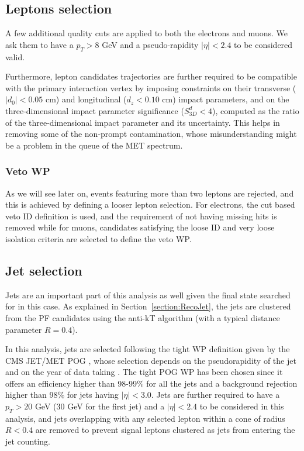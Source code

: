 \documentclass[a4paper, 10pt, openright]{report}
\begin{document}
\subsection{Leptons selection} \label{section:LepSel}

A few additional quality cuts are applied to both the electrons and muons. We ask them to have a $p_T > 8$ GeV and a pseudo-rapidity $|\eta| < 2.4$ to be considered valid.

Furthermore, lepton candidates trajectories are further required to be compatible with the primary interaction vertex by imposing constraints on their transverse ($|d_0| < 0.05$ cm) and longitudinal ($d_z < 0.10$ cm) impact parameters, and on the three-dimensional impact parameter significance ($S^d_{3D} < 4$), computed as the ratio of the three-dimensional impact parameter and its uncertainty. This helps in removing some of the non-prompt contamination, whose misunderstanding might be a problem in the queue of the \ac{MET} spectrum.

\subsubsection{Veto \ac{WP}}

As we will see later on, events featuring more than two leptons are rejected, and this is achieved by defining a looser lepton selection. For electrons, the cut based veto ID definition is used, and the requirement of not having missing hits is removed while for muons, candidates satisfying the loose ID and very loose isolation criteria are selected to define the veto \ac{WP}.

\subsection{Jet selection} \label{section:JetSel}

Jets are an important part of this analysis as well given the final state searched for in this case. As explained in Section~\ref{section:RecoJet}, the jets are clustered from the \ac{PF} candidates using the anti-kT algorithm (with a typical distance parameter $R = 0.4$). 

In this analysis, jets are selected following the tight \ac{WP} definition given by the \ac{CMS} JET/MET \ac{POG} \cite{JETMETPOG}, whose selection depends on the pseudorapidity of the jet and on the year of data taking \cite{JetWPs}. The tight \ac{POG} \ac{WP} has been chosen since it offers an efficiency higher than 98-99\% for all the jets and a background rejection higher than 98\% for jets having $|\eta| < 3.0$. Jets are further required to have a $p_T > 20$ GeV ($30$ GeV for the first jet) and a $|\eta| < 2.4$ to be considered in this analysis, and jets overlapping with any selected lepton within a cone of radius $R < 0.4$ are removed to prevent signal leptons clustered as jets from entering the jet counting.
\end{document}
